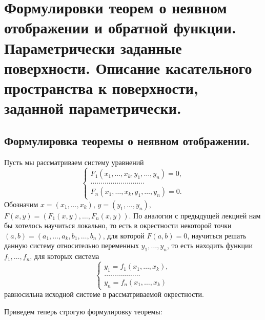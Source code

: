 \documentclass[a4paper]{article}
\theoremstyle{named}
\begin{document}
    \section{Формулировки теорем о неявном отображении и обратной функции. Параметрически заданные поверхности. Описание касательного пространства к поверхности, заданной параметрически.} 
    
    \subsection{Формулировка теоремы о неявном отображении.}

    Пусть мы рассматриваем систему уравнений
    $$
        \begin{cases}
            F_1(x_1,\ldots, x_k, y_1,\ldots, y_n)=0,\\
            \ldots\ldots\ldots\ldots\ldots\ldots\ldots\ldots\ldots\\
            F_n(x_1,\ldots, x_k, y_1,\ldots, y_n)=0.
        \end{cases}
    $$
    Обозначим $x=(x_1,\ldots, x_k)$, $y=(y_1,\ldots, y_n)$, $F(x,y)=(F_1(x,y),\ldots, F_n(x,y))$.
    По аналогии с предыдущей лекцией нам бы хотелось научиться локально, то есть в окрестности некоторой точки $(a,b)=(a_1,\ldots, a_k, b_1,\ldots, b_n)$,
    для которой $F(a,b)=0$, научиться решать данную систему относительно переменных $y_1,\ldots, y_n$, то есть находить функции $f_1,\ldots, f_n$,
    для которых система
    $$
        \begin{cases}
            y_1=f_1(x_1,\ldots, x_k),\\
            \ldots\ldots\ldots\ldots\ldots\ldots\\
            y_n=f_n(x_1,\ldots, x_k)
        \end{cases}
    $$
    равносильна исходной системе в рассматриваемой окрестности.
    
    Приведем теперь строгую формулировку теоремы:
    
\end{document}
